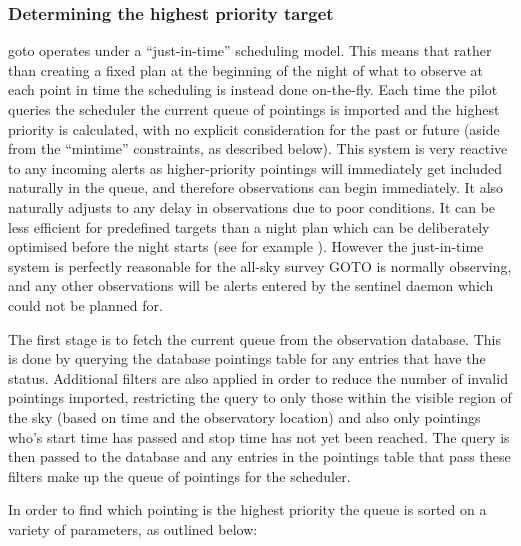 \begin{colsection}
\begin{colsection}

\clearpage

\subsubsection{Determining the highest priority target}

\gls{goto} operates under a ``just-in-time'' scheduling model. This means that rather than creating a fixed plan at the beginning of the night of what to observe at each point in time the scheduling is instead done on-the-fly. Each time the pilot queries the scheduler the current queue of pointings is imported and the highest priority is calculated, with no explicit consideration for the past or future (aside from the ``mintime'' constraints, as described below). This system is very reactive to any incoming alerts as higher-priority pointings will immediately get included naturally in the queue, and therefore observations can begin immediately. It also naturally adjusts to any delay in observations due to poor conditions. It can be less efficient for predefined targets than a night plan which can be deliberately optimised before the night starts (see for example \citet{ZTF_scheduler}). However the just-in-time system is perfectly reasonable for the all-sky survey GOTO is normally observing, and any other observations will be alerts entered by the sentinel daemon which could not be planned for.

The first stage is to fetch the current queue from the observation database. This is done by querying the database pointings table for any entries that have the  status. Additional filters are also applied in order to reduce the number of invalid pointings imported, restricting the query to only those within the visible region of the sky (based on time and the observatory location) and also only pointings who's start time has passed and stop time has not yet been reached. The query is then passed to the database and any entries in the pointings table that pass these filters make up the queue of pointings for the scheduler.

In order to find which pointing is the highest priority the queue is sorted on a variety of parameters, as outlined below:

\begin{itemize}


\end{itemize}
\end{colsection}
\end{colsection}

